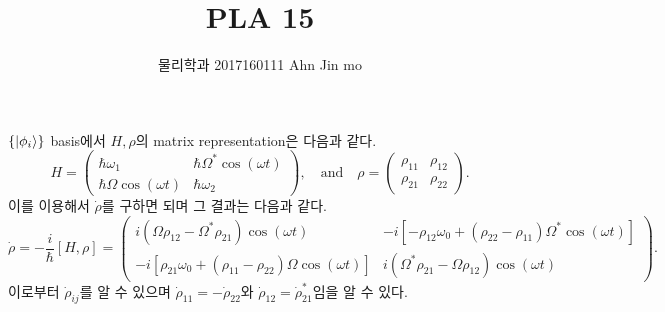 \documentclass[10pt, a4paper]{article}
\title{PLA 15}
\author{물리학과 2017160111 Ahn Jin mo}
\date{}
\numberwithin{equation}{section}
\begin{document}
    \maketitle
    \section{}
    \subsection{}
    $\{\ket{\phi_i}\}$ basis에서 $H, \rho$의 matrix representation은 다음과 같다.
    \begin{equation}
        H = 
        \begin{pmatrix}
            \hbar \omega_1 & \hbar \Omega^* \cos(\omega t) \\
            \hbar \Omega \cos(\omega t) & \hbar \omega_2
        \end{pmatrix}, \quad \text{and} \quad
        \rho = 
        \begin{pmatrix}
            \rho_{11} & \rho_{12} \\ \rho_{21} & \rho_{22}
        \end{pmatrix}.
    \end{equation}
    이를 이용해서 $\dot{\rho}$를 구하면 되며 그 결과는 다음과 같다.
    \begin{equation}
        \dot{\rho} = -\dfrac{i}{\hbar}[H ,\rho] = 
        \begin{pmatrix}
            i(\Omega\rho_{12} - \Omega^* \rho_{21})\cos(\omega t) & -i[ -\rho_{12}\omega_0 + (\rho_{22} - \rho_{11})\Omega^* \cos(\omega t)]\\
            -i[\rho_{21}\omega_0 + (\rho_{11} - \rho_{22})\Omega \cos(\omega t)] & i(\Omega^* \rho_{21} - \Omega \rho_{12})\cos(\omega t)
        \end{pmatrix}.
    \end{equation}
    이로부터 $\dot{\rho}_{ij}$를 알 수 있으며 $\dot{\rho}_{11} = -\dot{\rho}_{22}$와 $\dot{\rho}_{12} = \dot{\rho}_{21}^*$임을 알 수 있다.
\end{document}
